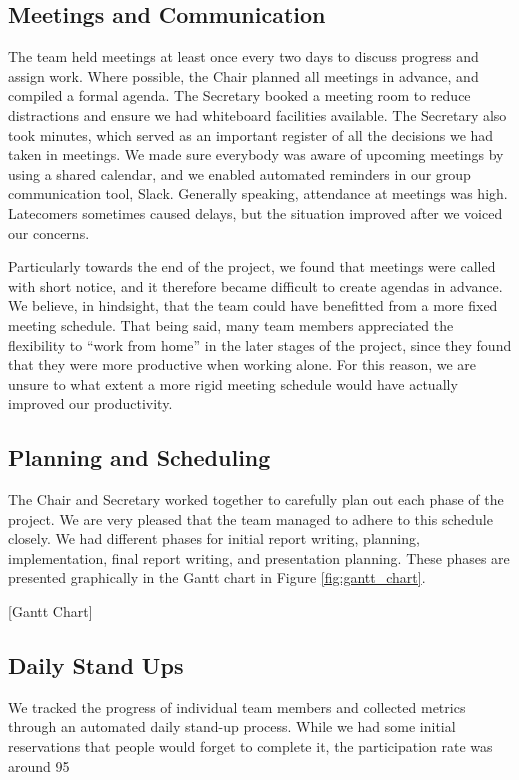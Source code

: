 \subsection{Meetings and Communication}
\label{sec:meetings}
The team held meetings at least once every two days to discuss progress and assign work. Where possible, the Chair planned all meetings in advance, and compiled a formal agenda. The Secretary booked a meeting room to reduce distractions and ensure we had whiteboard facilities available. The Secretary also took minutes, which served as an important register of all the decisions we had taken in meetings. We made sure everybody was aware of upcoming meetings by using a shared calendar, and we enabled automated reminders in our group communication tool, Slack. Generally speaking, attendance at meetings was high. Latecomers sometimes caused delays, but the situation improved after we voiced our concerns. 

Particularly towards the end of the project, we found that meetings were called with short notice, and it therefore became difficult to create agendas in advance. We believe, in hindsight, that the team could have benefitted from a more fixed meeting schedule. That being said, many team members appreciated the flexibility to “work from home” in the later stages of the project, since they found that they were more productive when working alone. For this reason, we are unsure to what extent a more rigid meeting schedule would have actually improved our productivity.

\subsection{Planning and Scheduling}
The Chair and Secretary worked together to carefully plan out each phase of the project. We are very pleased that the team managed to adhere to this schedule closely. We had different phases for initial report writing, planning, implementation, final report writing, and presentation planning. These phases are presented graphically in the Gantt chart in Figure \ref{fig:gantt_chart}.

[Gantt Chart]

\subsection{Daily Stand Ups}
\label{sec:standups}
We tracked the progress of individual team members and collected metrics through an automated daily stand-up process. While we had some initial reservations that people would forget to complete it, the participation rate was around 95%


